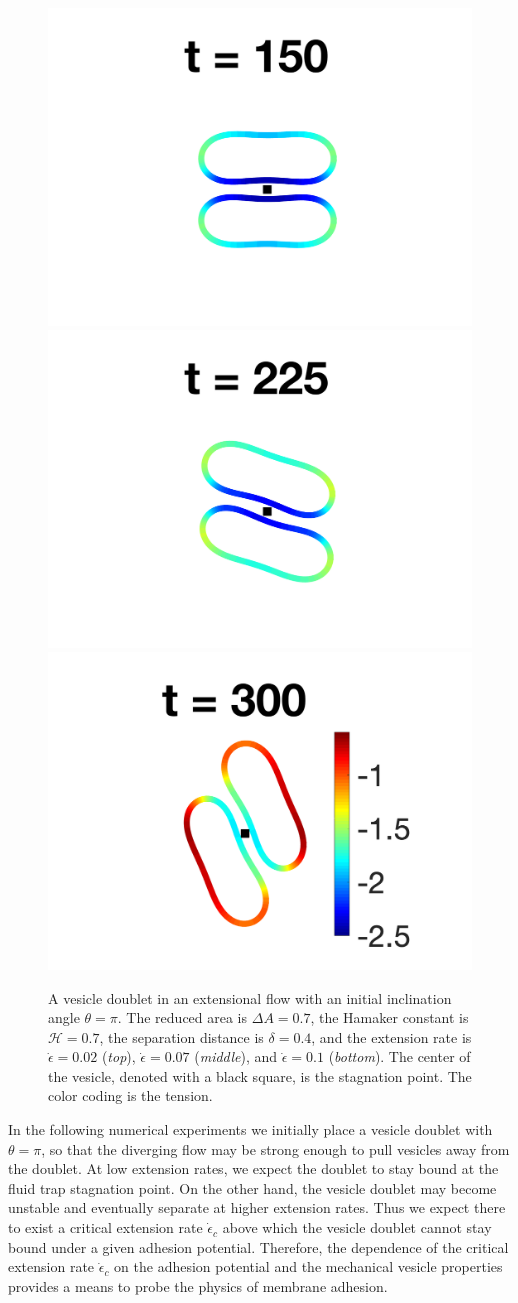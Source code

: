 \documentclass[prf,superscriptaddress,showkeys,longbibliography]{revtex4-1}
\begin{document}
\begin{figure}[htp]
  \includegraphics[height = 0.18\textwidth,trim={4cm 1cm 4cm 1cm},clip]
    {figs/extensional_adR4em1adS7em1Chi1em1_ra070_tension_image03.png}
  \includegraphics[height = 0.18\textwidth,trim={4cm 1cm 4cm 1cm},clip]
    {figs/extensional_adR4em1adS7em1Chi1em1_ra070_tension_image04.png}
  \includegraphics[height = 0.18\textwidth,trim={4cm 1cm 3cm 1cm},clip]
    {figs/extensional_adR4em1adS7em1Chi1em1_ra070_tension_image05.png}
  \caption{\label{fig:extensional1} A vesicle doublet in an extensional
  flow with an initial inclination angle $\theta=\pi$.  The reduced
  area is $\Delta A = 0.7$, the Hamaker constant is $\mathcal{H} = 0.7$,
  the separation distance is $\delta = 0.4$, and the extension rate is
  $\dot\epsilon = 0.02$ ({\em top}), $\dot\epsilon=0.07$ ({\em middle}), and $\dot\epsilon =
  0.1$ ({\em bottom}).  The center of the vesicle, denoted with a black
  square, is the stagnation point.  The color coding is the tension.}
  \end{figure}

In the following numerical experiments we initially place a vesicle
doublet with $\theta=\pi$, so that the diverging flow may be strong
enough to pull vesicles away from the doublet.  At low extension
rates, we expect the doublet to stay bound at the fluid trap stagnation
point.  On the other hand, the vesicle doublet may become unstable and
eventually separate at higher extension rates.  Thus we expect there
to exist a critical extension rate $\dot\epsilon_c$ above which the vesicle
doublet cannot stay bound under a given adhesion potential.  Therefore,
the dependence of the critical extension rate $\dot\epsilon_c$ on the adhesion
potential and the mechanical vesicle properties provides a means to
probe the physics of membrane adhesion.
\end{document}

